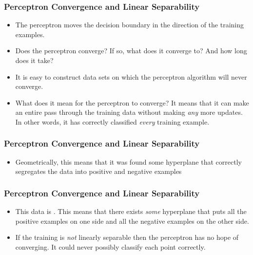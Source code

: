 \documentclass[trans]{beamer}
\begin{document}
\begin{frame}
  \frametitle{Perceptron Convergence and Linear Separability}
\begin{itemize}
\item
The perceptron moves the decision boundary in the direction of the training
examples.  
\item Does the
perceptron converge?  If so, what does it converge to?  And how long
does it take?
\item
It is easy to construct data sets on which the perceptron algorithm
will never converge. 
%
%
%
\item What does it mean for the perceptron to converge?  It means that it
can make an entire pass through the training data without making
\emph{any} more updates.  In other words, it has correctly classified
\emph{every} training example.
\end{itemize}
\end{frame}
\begin{frame}
  \frametitle{Perceptron Convergence and Linear Separability}
\begin{itemize}
\item
  Geometrically, this means that it was
found some hyperplane that correctly segregates the data into positive
and negative examples
\end{itemize}
\end{frame}
\begin{frame}
  \frametitle{Perceptron Convergence and Linear Separability}
\begin{itemize}
\item
This data is .  This means
that there exists \emph{some} hyperplane that puts all the positive
examples on one side and all the negative examples on the other side.
\item 
If the training is \emph{not} linearly separable  then the perceptron has no hope of
converging.  It could never possibly classify each point correctly.
\end{itemize}

\end{frame}
\end{document}
